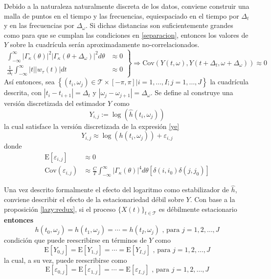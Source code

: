 \documentclass[12pt,letterpaper]{book}
\newcommand{\intR}{\int_{-\infty}^{\infty}}
\newcommand{\E}[1]{\mathrm{E}\left[ #1 \right]}
\newcommand{\Cov}[1]{\mathrm{Cov}\left( #1 \right)}
\newcommand{\abso}[1]{\left| #1 \right|}
\newcommand{\xt}{$\{X(t)\}_{t\in \mathcal{T}}$ }
\begin{document}
Debido a la naturaleza naturalmente discreta de los datos, conviene construir una malla de puntos en el tiempo y las frecuencias, equiespaciado en el tiempo por $\Delta_t$ y en las frecuencias por $\Delta_\omega$.
%
Si dichas distancias son suficientemente grandes como para que se cumplan las condiciones en \ref{separacion}, entonces los valores de $Y$ sobre la cuadrícula serán aproximadamente no-correlacionados.
%
\begin{equation}
\left.
\begin{aligned}
\intR \abso{\Gamma_\kappa(\theta)}^{2}\abso{\Gamma_\kappa(\theta+\Delta_\omega)}^{2} d\theta 
&\approx 0 \\
\frac{1}{\Delta_t} \intR \abso{t} \abso{w_\tau (t)} dt &\approx 0
\end{aligned}
\right\rbrace
\Rightarrow
\Cov{Y(t,\omega),Y(t+\Delta_t,\omega+\Delta_\omega)} \approx 0
\label{separacion}
\end{equation}
%
Así entonces, sea
$\left\{ (t_i,\omega_j) \in \mathcal{T} \times [-\pi,\pi] | i = 1,\dots,I ; j=1,\dots,J \right\}$
la cuadrícula descrita, con $\abso{t_i - t_{i+1}}= \Delta_t$ y 
$\abso{\omega_j-\omega_{j+1}}= \Delta_\omega$. 
%
Se define al construye una versión discretizada del estimador $Y$ como
\begin{equation}
Y_{i,j} := \log\left(\widehat{h}(t_i,\omega_j)\right)
\end{equation}
%
la cual satisface la versión discretizada de la expresión \ref{ye} 
\begin{equation}
Y_{i,j} \approx \log\left(h(t_i,\omega_j)\right) + \varepsilon_{i,j}
\label{def:ye}
\end{equation}
donde
\begin{align}
\E{\varepsilon_{i,j}} &\approx 0 \\
\Cov{\varepsilon_{i,j}} &\approx
\frac{C}{T} \intR \abso{\Gamma_\kappa(\theta)}^{4} d\theta \left[ \delta(i,i_0)\delta(j,j_0) \right]
\end{align}

Una vez descrito formalmente el efecto del logaritmo como estabilizador de $\widehat{h}$,
conviene describir el efecto de la estacionariedad débil sobre $Y$.
%
Con base a la proposición \ref{lazy:redux}, si el proceso \xt es débilmente estacionario \textbf{entonces}
%
\begin{equation}
h(t_0,\omega_j) = h(t_1,\omega_j) = \cdots = h(t_I,\omega_j) \text{ , para } j = 1, 2, \dots , J
\label{h1}
\end{equation}
condición que puede reescribirse en términos de $Y$ como
%
\begin{equation}
\E{Y_{0,j}} = \E{Y_{1,j}} = \cdots = \E{Y_{I,j}} \text{ , para } j = 1, 2, \dots , J
\label{h2}
\end{equation}
%
la cual, a su vez, puede reescribirse como
\begin{equation}
\E{\varepsilon_{0,j}} = \E{\varepsilon_{1,j}} = \cdots = \E{\varepsilon_{I,j}} \text{ , para } j = 1, 2, \dots , J
\label{h3}
\end{equation}
\end{document}
